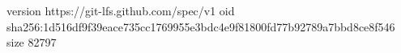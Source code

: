 version https://git-lfs.github.com/spec/v1
oid sha256:1d516df9f39eace735cc1769955e3bdc4e9f81800fd77b92789a7bbd8ce8f546
size 82797

